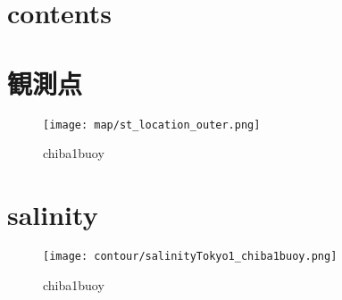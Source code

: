\documentclass[12pt,a4paper]{jarticle}
\begin{document}
\section{contents}




\section{観測点}
\begin{figure}[hbtp]
  \texttt{[image: map/st\_location\_outer.png]}
  \caption{chiba1buoy}
  \label{地図}
\end{figure}

\section{salinity}
\begin{figure}[hbtp]
    \texttt{[image: contour/salinityTokyo1\_chiba1buoy.png]}
    \caption{chiba1buoy}
\end{figure}
\end{document}
